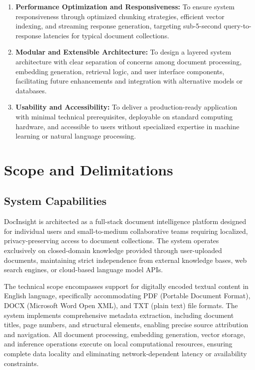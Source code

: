 \begin{enumerate}
    \item \textbf{Performance Optimization and Responsiveness:} To ensure system responsiveness through optimized chunking strategies, efficient vector indexing, and streaming response generation, targeting sub-5-second query-to-response latencies for typical document collections.
    
    \item \textbf{Modular and Extensible Architecture:} To design a layered system architecture with clear separation of concerns among document processing, embedding generation, retrieval logic, and user interface components, facilitating future enhancements and integration with alternative models or databases.
    
    \item \textbf{Usability and Accessibility:} To deliver a production-ready application with minimal technical prerequisites, deployable on standard computing hardware, and accessible to users without specialized expertise in machine learning or natural language processing.
\end{enumerate}

\section{Scope and Delimitations}

\subsection{System Capabilities}

DocInsight is architected as a full-stack document intelligence platform designed for individual users and small-to-medium collaborative teams requiring localized, privacy-preserving access to document collections. The system operates exclusively on closed-domain knowledge provided through user-uploaded documents, maintaining strict independence from external knowledge bases, web search engines, or cloud-based language model APIs.

The technical scope encompasses support for digitally encoded textual content in English language, specifically accommodating PDF (Portable Document Format), DOCX (Microsoft Word Open XML), and TXT (plain text) file formats. The system implements comprehensive metadata extraction, including document titles, page numbers, and structural elements, enabling precise source attribution and navigation. All document processing, embedding generation, vector storage, and inference operations execute on local computational resources, ensuring complete data locality and eliminating network-dependent latency or availability constraints.

